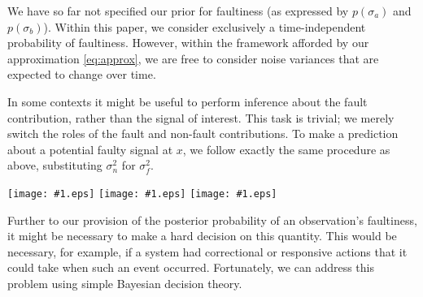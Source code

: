 \documentclass{article}
\newcommand{\psff}[1]{\texttt{[image: \#1.eps]}}
\begin{document}
We have so far not specified our prior for faultiness (as expressed by $p(\sigma_a)$ and $p(\sigma_b)$). Within this paper, we consider exclusively a time-independent probability of faultiness. However, within the framework afforded by our approximation \eqref{eq:approx}, we are free to consider noise variances that are expected to change over time.

In some contexts it might be useful to perform inference about the
fault contribution, rather than the signal of interest.  
This task is trivial; we merely switch the roles of the fault and non-fault
contributions.  To make a prediction about a potential faulty signal
at $x$, we follow exactly the same procedure as above, substituting
$\sigma_n^2$ for $\sigma_f^2$.

\begin{figure*}
  \centering
  \psff{bias}
  \psff{dynamics}
  \psff{painting}
  \label{test}
\end{figure*}

Further to our provision of the posterior probability of an
observation's faultiness, it might be necessary to make a hard
decision on this quantity. This would be necessary, for example, if a
system had correctional or responsive actions that it could take when
such an event occurred.  Fortunately, we can address this problem
using simple Bayesian decision theory.

\end{document}
